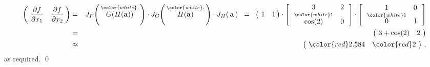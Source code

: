 \begin{eqnarray*}
	\left(\!\begin{array}{cc}
		\dfrac{\partial f}{\partial x_{1}} & \dfrac{\partial f}{\partial x_{2}}
		\end{array}\!\!\right)
& = &
	J_{F}\!\left(\,\overset{{\color{white}.}}{G(H(\mathbf{a}))}\,\right)
	\cdot
	J_{G}\!\left(\,\overset{{\color{white}.}}{H(\mathbf{a})}\,\right)
	\cdot
	J_{H}\!\left(\,\mathbf{a}\,\right)
\;\; = \;\;
	\left(\!\begin{array}{cc}
		1 & 1
		\end{array}\!\!\right)
	\cdot
	\left[\,\begin{array}{cc}
		3 & 2
		\\
		\overset{{\color{white}1}}{\cos(2)} & 0
		\end{array}\,\right]
	\cdot
	\left[\,\begin{array}{cc}
		1 & 0
		\\
		\overset{{\color{white}1}}{0} & 1
		\end{array}\,\right]
\\
& = &
	\left(\!\begin{array}{cc}
		3 + \cos(2) & 2
		\end{array}\!\right)
\\
& \approx &
	\left(\!\begin{array}{cc}
		{\color{red}2.584} & {\color{red}2}
		\end{array}\!\right)\,,
\end{eqnarray*}
as required.
\qed


\renewcommand{\theenumi}{\roman{enumi}}
\renewcommand{\labelenumi}{\textnormal{(\theenumi)}$\;\;$}

